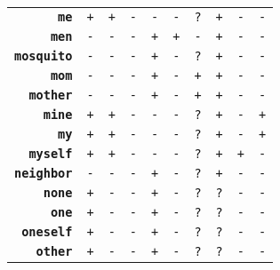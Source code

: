 \documentclass{article}
\begin{document}
\begin{minipage}{\textwidth}
{\begin{tabular}{|r|c|c|c|c|c|c|c|c|c|}
    \textbf{\texttt{me}} & \texttt{+}
    & \texttt{+} & \texttt{-}
    & \texttt{-} & \texttt{-}
    & \texttt{?} & \texttt{+}
    & \texttt{-} & \texttt{-} \\
    \textbf{\texttt{men}} & \texttt{-}
    & \texttt{-} & \texttt{-}
    & \texttt{+} & \texttt{+}
    & \texttt{-} & \texttt{+}
    & \texttt{-} & \texttt{-} \\
    \textbf{\texttt{mosquito}} & \texttt{-}
    & \texttt{-} & \texttt{-}
    & \texttt{+} & \texttt{-}
    & \texttt{?} & \texttt{+}
    & \texttt{-} & \texttt{-} \\
    \textbf{\texttt{mom}} & \texttt{-}
    & \texttt{-} & \texttt{-}
    & \texttt{+} & \texttt{-}
    & \texttt{+} & \texttt{+}
    & \texttt{-} & \texttt{-} \\
    \textbf{\texttt{mother}} & \texttt{-}
    & \texttt{-} & \texttt{-}
    & \texttt{+} & \texttt{-}
    & \texttt{+} & \texttt{+}
    & \texttt{-} & \texttt{-} \\
    \textbf{\texttt{mine}} & \texttt{+}
    & \texttt{+} & \texttt{-}
    & \texttt{-} & \texttt{-}
    & \texttt{?} & \texttt{+}
    & \texttt{-} & \texttt{+} \\
    \textbf{\texttt{my}} & \texttt{+}
    & \texttt{+} & \texttt{-}
    & \texttt{-} & \texttt{-}
    & \texttt{?} & \texttt{+}
    & \texttt{-} & \texttt{+} \\
    \textbf{\texttt{myself}} & \texttt{+}
    & \texttt{+} & \texttt{-}
    & \texttt{-} & \texttt{-}
    & \texttt{?} & \texttt{+}
    & \texttt{+} & \texttt{-} \\
    \textbf{\texttt{neighbor}} & \texttt{-}
    & \texttt{-} & \texttt{-}
    & \texttt{+} & \texttt{-}
    & \texttt{?} & \texttt{+}
    & \texttt{-} & \texttt{-} \\
    \textbf{\texttt{none}} & \texttt{+}
    & \texttt{-} & \texttt{-}
    & \texttt{+} & \texttt{-}
    & \texttt{?} & \texttt{?}
    & \texttt{-} & \texttt{-} \\
    \textbf{\texttt{one}} & \texttt{+}
    & \texttt{-} & \texttt{-}
    & \texttt{+} & \texttt{-}
    & \texttt{?} & \texttt{?}
    & \texttt{-} & \texttt{-} \\
    \textbf{\texttt{oneself}} & \texttt{+}
    & \texttt{-} & \texttt{-}
    & \texttt{+} & \texttt{-}
    & \texttt{?} & \texttt{?}
    & \texttt{-} & \texttt{-} \\
    \textbf{\texttt{other}} & \texttt{+}
    & \texttt{-} & \texttt{-}
    & \texttt{+} & \texttt{-}
    & \texttt{?} & \texttt{?}
    & \texttt{-} & \texttt{-} \\

\end{tabular}}
\end{minipage}
\end{document}
